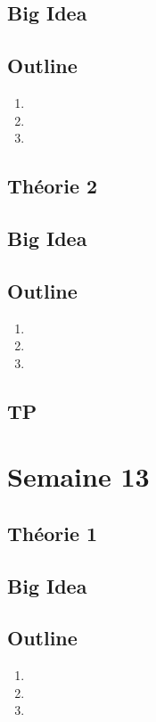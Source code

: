 \documentclass{article}
\begin{document}
\subsection*{Big Idea}
\subsection*{Outline}
\begin{enumerate}
    \item
    \item
    \item
\end{enumerate}
\subsection{Théorie 2}
\subsection*{Big Idea}
\subsection*{Outline}
\begin{enumerate}
    \item
    \item
    \item
\end{enumerate}
\subsection{TP}

\pagebreak
\section{Semaine 13}
\subsection{Théorie 1}
\subsection*{Big Idea}
\subsection*{Outline}
\begin{enumerate}
    \item
    \item
    \item
\end{enumerate}
\end{document}
